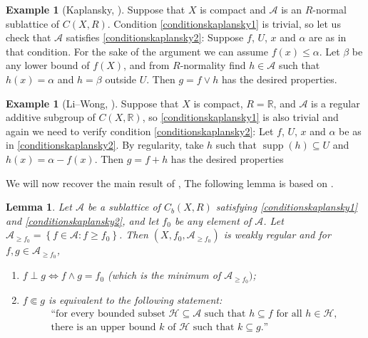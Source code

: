 \documentclass[letter,11pt]{amsart}
\theoremstyle{plain}		\newtheorem{theorem}[generalnumbering]{Theorem}
\theoremstyle{plain}		\newtheorem{corollary}[generalnumbering]{Corollary}
\theoremstyle{definition}		\newtheorem{definition}[generalnumbering]{Definition}
\theoremstyle{definition}		\newtheorem{example}[generalnumbering]{Example}
\theoremstyle{plain}		\newtheorem{proposition}[generalnumbering]{Proposition}
\theoremstyle{plain}		\newtheorem{lemma}[generalnumbering]{Lemma}
\theoremstyle{plain}    \newtheorem{plainstyle}[generalnumbering]{\namefordifferentenvironment}
\theoremstyle{plain}    \newtheorem*{plainstyle*}{\namefordifferentenvironment}
\theoremstyle{definition}    \newtheorem{definitionstyle}[generalnumbering]{\namefordifferentenvironment}
\theoremstyle{definition}    \newtheorem*{definitionstyle*}{\namefordifferentenvironment}
\DeclareMathOperator{\supp}{supp}
\begin{document}
\begin{example}[{Kaplansky, \cite{MR0020715}}]\label{examplekaplanskyisl1l2}
	Suppose that $X$ is compact and $\mathcal{A}$ is an $R$-normal sublattice of $C(X,R)$. Condition \ref{conditionskaplansky1} is trivial, so let us check that $\mathcal{A}$ satisfies \ref{conditionskaplansky2}: Suppose $f$, $U$, $x$ and $\alpha$ are as in that condition. For the sake of the argument we can assume $f(x)\leq\alpha$. Let $\beta$ be any lower bound of $f(X)$, and from $R$-normality find $h\in\mathcal{A}$ such that $h(x)=\alpha$ and $h=\beta$ outside $U$. Then $g=f\lor h$ has the desired properties.
\end{example}

\begin{example}[{Li--Wong,  \cite{MR3162258}}]
	Suppose that $X$ is compact, $R=\mathbb{R}$, and $\mathcal{A}$ is a regular additive subgroup of $C(X,\mathbb{R})$, so \ref{conditionskaplansky1} is also trivial and again we need to verify condition \ref{conditionskaplansky2}: Let $f$, $U$, $x$ and $\alpha$ be as in \ref{conditionskaplansky2}. By regularity, take $h$ such that $\supp(h)\subseteq U$ and $h(x)=\alpha-f(x)$. Then $g=f+h$ has the desired properties
\end{example}

We will now recover the main result of \cite{MR0020715}, The following lemma is based on \cite{MR0052760}.

\begin{lemma}\label{importantlemmakaplansky}
	Let $\mathcal{A}$ be a sublattice of $C_b(X,R)$ satisfying \ref{conditionskaplansky1} and \ref{conditionskaplansky2}, and let $f_0$ be any element of $\mathcal{A}$. Let $\mathcal{A}_{\geq f_0}=\left\{f\in\mathcal{A}:f\geq f_0\right\}$. Then $(X,f_0,\mathcal{A}_{\geq f_0})$ is weakly regular and for $f,g\in\mathcal{A}_{\geq f_0}$,
	\begin{enumerate}[label=(\alph*)]
		\item\label{importantlemmakaplansky(a)} $f\perp g\iff f\land g=f_0$ (which is the minimum of $\mathcal{A}_{\geq f_0})$;
		\item\label{importantlemmakaplansky(b)} $f\Subset g$ is equivalent to the following statement:
		\[\begin{split}
		\text{``for every bounded subset $\mathcal{H}\subseteq\mathcal{A}$ such that $h\subseteq f$ for all $h\in\mathcal{H}$,}\\
		\text{there is an upper bound $k$ of $\mathcal{H}$ such that $k\subseteq g$.''}\end{split}\tag{K}\]
	\end{enumerate}
\end{lemma}
\end{document}
